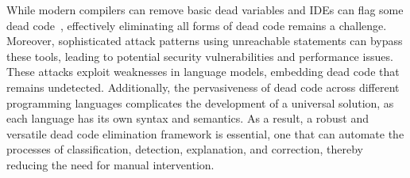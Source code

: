 \documentclass[11pt]{article}
\begin{document}

While modern compilers can remove basic dead variables and IDEs can flag some dead code~\cite{wang2017dead, romano2016graph}, effectively eliminating all forms of dead code remains a challenge. Moreover, sophisticated attack patterns using unreachable statements can bypass these tools, leading to potential security vulnerabilities and performance issues. These attacks exploit weaknesses in language models, embedding dead code that remains undetected. Additionally, the pervasiveness of dead code across different programming languages complicates the development of a universal solution, as each language has its own syntax and semantics. As a result, a robust and versatile dead code elimination framework is essential, one that can automate the processes of classification, detection, explanation, and correction, thereby reducing the need for manual intervention.
\end{document}
